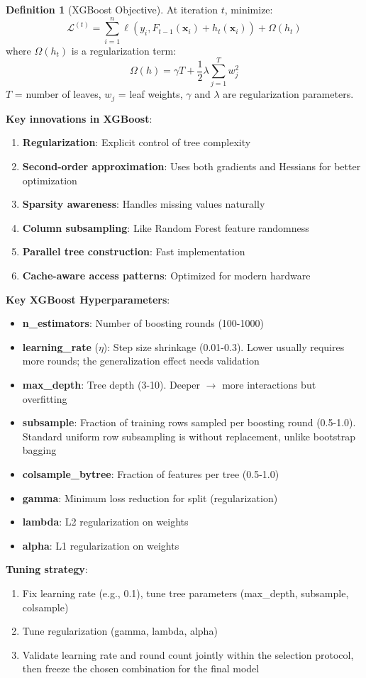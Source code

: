 \documentclass[11pt,twoside]{article}
\numberwithin{equation}{section}
\newcommand{\vect}[1]{\bm{#1}}
\newcommand{\Loss}{\mathcal{L}}
\theoremstyle{plain}
\theoremstyle{definition}
\newtheorem{definition}[theorem]{Definition}
\theoremstyle{remark}
\begin{document}
\begin{definition}[XGBoost Objective]
At iteration $t$, minimize:
\[
\Loss^{(t)} = \sum_{i=1}^n \ell(y_i, F_{t-1}(\vect{x}_i) + h_t(\vect{x}_i)) + \Omega(h_t)
\]
where $\Omega(h_t)$ is a regularization term:
\[
\Omega(h) = \gamma T + \frac{1}{2}\lambda\sum_{j=1}^T w_j^2
\]
$T$ = number of leaves, $w_j$ = leaf weights, $\gamma$ and $\lambda$ are regularization parameters.
\end{definition}

\textbf{Key innovations in XGBoost}:
\begin{enumerate}
\item \textbf{Regularization}: Explicit control of tree complexity
\item \textbf{Second-order approximation}: Uses both gradients and Hessians for better optimization
\item \textbf{Sparsity awareness}: Handles missing values naturally
\item \textbf{Column subsampling}: Like Random Forest feature randomness
\item \textbf{Parallel tree construction}: Fast implementation
\item \textbf{Cache-aware access patterns}: Optimized for modern hardware
\end{enumerate}

\begin{implementationbox}
\textbf{Key XGBoost Hyperparameters}:

\begin{itemize}
\item \textbf{n\_estimators}: Number of boosting rounds (100-1000)
\item \textbf{learning\_rate} ($\eta$): Step size shrinkage (0.01-0.3). Lower usually requires more rounds; the generalization effect needs validation
\item \textbf{max\_depth}: Tree depth (3-10). Deeper $\to$ more interactions but overfitting
\item \textbf{subsample}: Fraction of training rows sampled per boosting round (0.5-1.0). Standard uniform row subsampling is without replacement, unlike bootstrap bagging
\item \textbf{colsample\_bytree}: Fraction of features per tree (0.5-1.0)
\item \textbf{gamma}: Minimum loss reduction for split (regularization)
\item \textbf{lambda}: L2 regularization on weights
\item \textbf{alpha}: L1 regularization on weights
\end{itemize}

\textbf{Tuning strategy}:
\begin{enumerate}
\item Fix learning rate (e.g., 0.1), tune tree parameters (max\_depth, subsample, colsample)
\item Tune regularization (gamma, lambda, alpha)
\item Validate learning rate and round count jointly within the selection protocol, then freeze the chosen combination for the final model
\end{enumerate}
\end{implementationbox}
\end{document}
